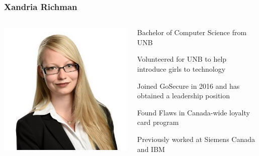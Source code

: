 \documentclass[aspectratio=169]{beamer}
\begin{document}
\begin{frame}
  \frametitle{Xandria Richman}
  \begin{columns}
    \begin{column}{0.5\textwidth}
      \includegraphics[scale=0.33]{xandria_richman}
    \end{column}
    \begin{column}{0.5\textwidth}
      \begin{center}
        \begin{tcolorbox}[title=Biography,colback=gray]
          \begin{itemize}
            {\color{black} \tiny
            \item Bachelor of Computer Science from UNB
            \item Volunteered for UNB to help introduce girls to technology
            \item Joined GoSecure in 2016 and has obtained a leadership position
            \item Found Flaws in Canada-wide loyalty card program
            \item Previously worked at Siemens Canada and IBM
            }
          \end{itemize}
        \end{tcolorbox}
      \end{center}
    \end{column}
  \end{columns}
\end{frame}
\end{document}
